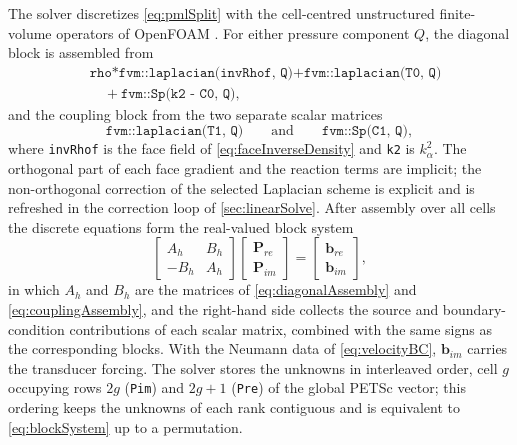 \documentclass[final,12pt,nopreprintline]{elsarticle}
\newcommand{\code}[1]{\texttt{#1}}
\begin{document}
The solver discretizes \cref{eq:pmlSplit} with the cell-centred unstructured
finite-volume operators of OpenFOAM \cite{Jasak1996,Moukalled2016}.  For either
pressure component $Q$, the diagonal block is assembled from
\begin{equation}
\begin{aligned}
    &\texttt{rho*fvm::laplacian(invRhof, Q)}
    +\texttt{fvm::laplacian(T0, Q)}\\
    &\quad+\texttt{fvm::Sp(k2 - C0, Q)},
\end{aligned}
    \label{eq:diagonalAssembly}
\end{equation}
and the coupling block from the two separate scalar matrices
\begin{equation}
    \texttt{fvm::laplacian(T1, Q)}
    \qquad\text{and}\qquad
    \texttt{fvm::Sp(C1, Q)},
    \label{eq:couplingAssembly}
\end{equation}
where \code{invRhof} is the face field of \cref{eq:faceInverseDensity} and
\code{k2} is $k_\alpha^2$.  The orthogonal part of each face gradient and the
reaction terms are implicit; the non-orthogonal correction of the selected
Laplacian scheme is explicit and is refreshed in the correction loop of
\cref{sec:linearSolve}.  After assembly over all cells the discrete equations
form the real-valued block system
\begin{equation}
\begin{bmatrix}
    A_h & B_h \\
    -B_h & A_h
\end{bmatrix}
\begin{bmatrix}
    \mathbf{P}_{re} \\ \mathbf{P}_{im}
\end{bmatrix}
=
\begin{bmatrix}
    \mathbf{b}_{re} \\ \mathbf{b}_{im}
\end{bmatrix},
\label{eq:blockSystem}
\end{equation}
in which $A_h$ and $B_h$ are the matrices of \cref{eq:diagonalAssembly} and
\cref{eq:couplingAssembly}, and the right-hand side collects the source and
boundary-condition contributions of each scalar matrix, combined with the same
signs as the corresponding blocks.  With the Neumann data of
\cref{eq:velocityBC}, $\mathbf{b}_{im}$ carries the transducer forcing.  The
solver stores the unknowns in interleaved order, cell $g$ occupying rows $2g$
(\code{Pim}) and $2g+1$ (\code{Pre}) of the global PETSc vector; this ordering
keeps the unknowns of each rank contiguous and is equivalent to
\cref{eq:blockSystem} up to a permutation.
\end{document}
